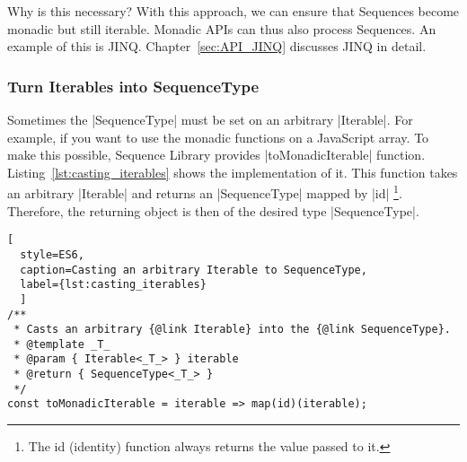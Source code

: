 Why is this necessary? With this approach, we can ensure that Sequences become
monadic but still iterable. Monadic APIs can thus also process Sequences. An
example of this is JINQ. Chapter~\ref{sec:API_JINQ} discusses JINQ in detail.


\subsubsection{Turn Iterables into SequenceType}
\label{subsub:Turn Iterables into SequenceType}
Sometimes the |SequenceType| must be set on an arbitrary |Iterable|. For example,
if you want to use the monadic functions on a JavaScript array. To make this
possible, Sequence Library provides |toMonadicIterable| function.
Listing~\ref{lst:casting_iterables} shows the
implementation of it. This function takes an arbitrary |Iterable| and returns an
|SequenceType| mapped by |id| \footnote{The id (identity) function always
returns the value passed to it.}. 
Therefore, the returning object is then of the desired type |SequenceType|.

\begin{lstlisting}[
  style=ES6, 
  caption=Casting an arbitrary Iterable to SequenceType,
  label={lst:casting_iterables}
  ]
/**
 * Casts an arbitrary {@link Iterable} into the {@link SequenceType}.
 * @template _T_
 * @param { Iterable<_T_> } iterable
 * @return { SequenceType<_T_> }
 */
const toMonadicIterable = iterable => map(id)(iterable);
\end{lstlisting}
